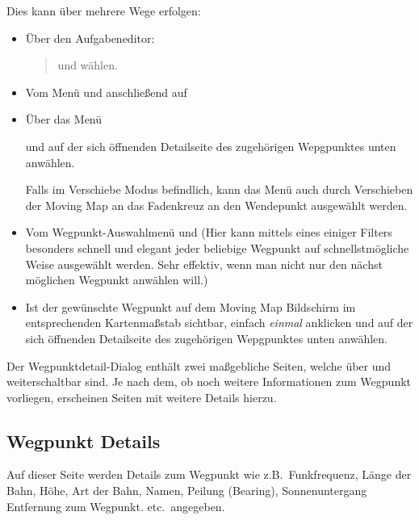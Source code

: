 Dies kann über mehrere Wege erfolgen:
\begin{itemize}\itemsep=1em
\item Über den Aufgabeneditor: 
\begin{quote}
\blink{}\blink{}\blink{} und  wählen.
\end{quote}
\item
Vom Menü \blink{}\blink{}  und anschließend auf 
\item
Über das Menü
\begin{quote}
\blink{}\blink{}\blink{}
\end{quote}
und auf der sich öffnenden Detailseite des zugehörigen Wepgpunktes unten  anwählen.

Falls im Verschiebe Modus befindlich, kann das Menü  auch durch Verschieben der Moving Map an das Fadenkreuz  an den Wendepunkt ausgewählt werden.
\item%
Vom Wegpunkt-Auswahlmenü \blink{} und 
(Hier kann mittels eines einiger Filters besonders schnell und elegant jeder beliebige Wegpunkt auf schnellstmögliche Weise ausgewählt werden. Sehr effektiv, wenn man nicht nur den nächst möglichen Wegpunkt anwählen will.)
\item
Ist der gewünschte Wegpunkt auf dem Moving Map Bildschirm im entsprechenden Kartenmaßstab  sichtbar, einfach \textsl{einmal} anklicken und auf der sich öffnenden Detailseite des zugehörigen Wepgpunktes unten  anwählen.
\end{itemize}

Der Wegpunktdetail-Dialog enthält zwei maßgebliche Seiten, welche über \button{$>$} und  \button{$<$} weiterschaltbar sind. Je nach dem, ob noch weitere Informationen zum Wegpunkt vorliegen, erscheinen Seiten mit weitere Details hierzu.

\subsection*{Wegpunkt Details}

Auf dieser Seite werden Details zum Wegpunkt wie z.B.\ Funkfrequenz, Länge der Bahn, Höhe, Art der Bahn, Namen, Peilung (Bearing), Sonnenuntergang Entfernung zum Wegpunkt. etc.\ angegeben.

